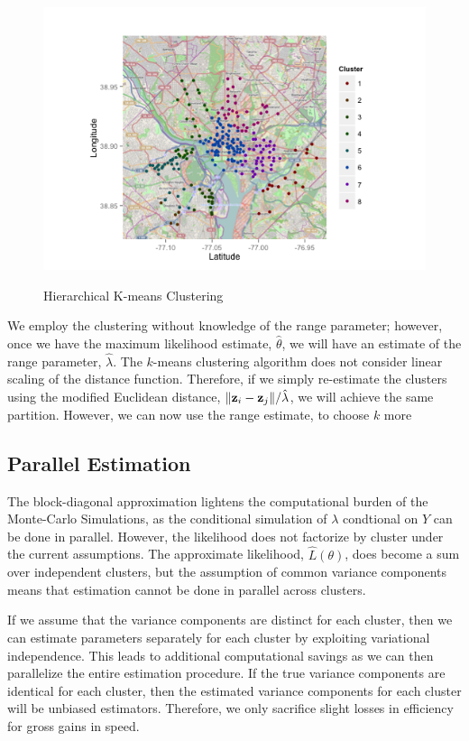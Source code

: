 \documentclass{acm_proc_article-sp}
\begin{document}
\begin{figure} [!h]
\caption{Hierarchical K-means Clustering}
\centering
\includegraphics[scale = 0.2]{cluster_map.png}
\label{fig:cluster_map}
\end{figure}

We employ the clustering without knowledge of the range parameter; however, once we have the maximum likelihood estimate, $\hat{\theta}$, we will have an estimate of the range parameter, $\hat{\lambda}$.  The $k$-means clustering algorithm does not consider linear scaling of the distance function.  Therefore, if we simply re-estimate the clusters using the modified Euclidean distance, $\|{\bf z}_i - {\bf z}_j \| / \hat{\lambda}$, we will achieve the same partition.  However, we can now use the range estimate, to choose $k$ more  

\subsection{Parallel Estimation}

The block-diagonal approximation lightens the computational burden of the Monte-Carlo Simulations, as the conditional simulation of $\lambda$ condtional on $Y$ can be done in parallel.  However, the likelihood does not factorize by cluster under the current assumptions.  The approximate likelihood, $\hat{L} (\theta)$, does become a sum over independent clusters, but the assumption of common variance components means that estimation cannot be done in parallel across clusters.

If we assume that the variance components are distinct for each cluster, then we can estimate parameters separately for each cluster by exploiting variational independence.  This leads to additional computational savings as we can then parallelize the entire estimation procedure.  If the true variance components are identical for each cluster, then the estimated variance components for each cluster will be unbiased estimators.  Therefore, we only sacrifice slight losses in efficiency for gross gains in speed.  
\end{document}
